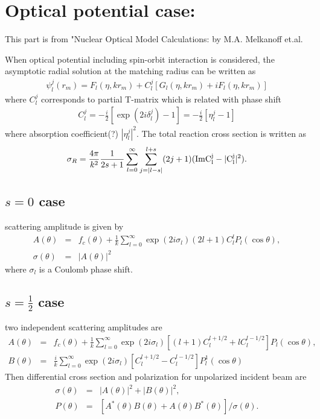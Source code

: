 \documentclass[10pt]{book}
\newcommand{\bea}{\begin{eqnarray}}
\newcommand{\eea}{\end{eqnarray}}
\newcommand{\no}{\nonumber \\}
\begin{document}
\section{Optical potential case:}
This part is from "Nuclear Optical Model Calculations: by M.A. Melkanoff et.al.

When optical potential including spin-orbit interaction is considered,
the asymptotic radial solution at the matching radius can be written as
\bea 
\psi_l^j(r_m)=F_l(\eta,kr_m)+C^j_l[G_l(\eta,k r_m)+i F_l(\eta,k r_m)] 
\eea 
where $C^j_l$ corresponds to partial T-matrix which is related with phase shift
\bea 
C_l^j=-\frac{i}{2}[\exp(2i\delta_l^j)-1]=-\frac{i}{2}[\eta_l^j-1]
\eea 
where absorption coefficient(?)  $|\eta_l^j|^2$.
The total reaction cross section is written as
\bea 
\sigma_R =\frac{4\pi}{k^2}\frac{1}{2s +1}\sum_{l=0}^\infty \sum_{j=|l-s|}^{l+s} 
           (2j+1)( \rm{Im} C_l^j -|C_l^j|^2 ).
\eea 
\subsection{$s=0$ case} 
scattering amplitude is given by 
\bea 
A(\theta)&=&f_c(\theta)+\frac{1}{k}\sum_{l=0}^\infty \exp(2i\sigma_l)(2l+1) C_{l}^l P_l(\cos\theta),
\no 
\sigma(\theta)&=& |A(\theta)|^2
\eea 
where $\sigma_l$ is a Coulomb phase shift.

\subsection{$s=\frac{1}{2}$ case} 
two independent scattering amplitudes are
\bea 
A(\theta)&=&f_c(\theta)+\frac{1}{k}\sum_{l=0}^\infty \exp(2i\sigma_l)
[(l+1) C_{l}^{l+1/2}+l C_{l}^{l-1/2}]P_l(\cos\theta),\no 
B(\theta)&=&\frac{i}{k}\sum_{l=0}^\infty\exp(2i\sigma_l)
[C_{l}^{l+1/2}-C_{l}^{l-1/2}]P_l^1 (\cos\theta)
\eea 
Then differential cross section and polarization for unpolarized incident beam are
\bea 
\sigma(\theta)&=&|A(\theta)|^2+|B(\theta)|^2,\no 
P(\theta)&=& [A^*(\theta) B(\theta)+A(\theta) B^*(\theta)]/\sigma(\theta).
\eea 
\end{document}
